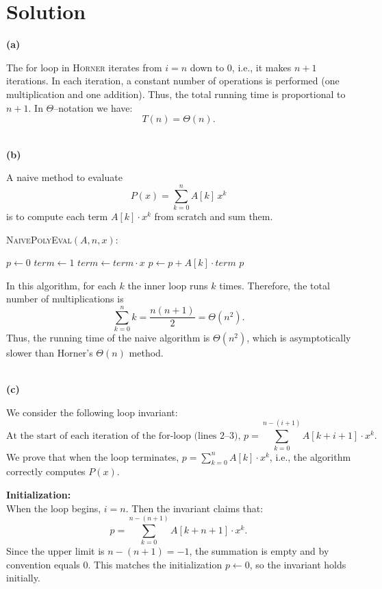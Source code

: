 \documentclass[11pt]{article}
\begin{document}
    \section*{Solution}

    \textbf{(a)}
    
    The for loop in \textsc{Horner} iterates from $i=n$ down to $0$, i.e., it makes $n+1$ iterations. In each iteration, a constant number of operations is performed (one multiplication and one addition). Thus, the total running time is proportional to $n+1$. In $\Theta$--notation we have:
    \[
    T(n)=\Theta(n).
    \]
    
    \vspace{2mm}
    \\
    \textbf{(b)}
    
    A naive method to evaluate
    \[
    P(x) = \sum_{k=0}^n A[k] \, x^k
    \]
    is to compute each term \(A[k] \cdot x^k\) from scratch and sum them. 
    
    \bigskip
    \textsc{NaivePolyEval}$(A, n, x)$:
    \begin{algorithmic}[1]
        \STATE $p \gets 0$
            \STATE $term \gets 1$
                \STATE $term \gets term \cdot x$
            \ENDFOR
            \STATE $p \gets p + A[k] \cdot term$
        \ENDFOR
        \RETURN $p$
    \end{algorithmic}
    \bigskip
    
    In this algorithm, for each $k$ the inner loop runs $k$ times. Therefore, the total number of multiplications is
    \[
    \sum_{k=0}^{n} k = \frac{n(n+1)}{2} = \Theta(n^2).
    \]
    Thus, the running time of the naive algorithm is $\Theta(n^2)$, which is asymptotically slower than Horner's $\Theta(n)$ method.
    
    \vspace{2mm}
    \\
    \textbf{(c)}
    
    We consider the following loop invariant:
    \[
    \text{At the start of each iteration of the for-loop (lines 2--3), } p = \sum_{k=0}^{n-(i+1)} A[k+i+1] \cdot x^k.
    \]
    We prove that when the loop terminates, $p = \sum_{k=0}^n A[k]\cdot x^k$, i.e., the algorithm correctly computes $P(x)$.
    
    \textbf{Initialization:} \\
    When the loop begins, $i = n$. Then the invariant claims that:
    \[
    p = \sum_{k=0}^{n-(n+1)} A[k+n+1] \cdot x^k.
    \]
    Since the upper limit is $n-(n+1) = -1$, the summation is empty and by convention equals $0$. This matches the initialization $p \gets 0$, so the invariant holds initially.
    
\end{document}
